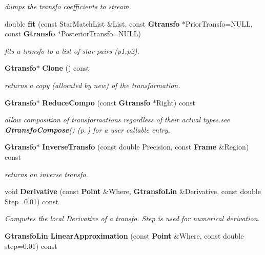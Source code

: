 \begin{CompactItemize}
\begin{CompactList}\small\item\em dumps the transfo coefficients to stream.\item\end{CompactList}\item 
double {\bf fit} (const Star\-Match\-List \&List, const {\bf Gtransfo} $\ast$Prior\-Transfo=NULL, const {\bf Gtransfo} $\ast$Posterior\-Transfo=NULL)
\begin{CompactList}\small\item\em fits a transfo to a list of star pairs (p1,p2).\item\end{CompactList}\item 
{}
{\bf Gtransfo}$\ast$ {\bf Clone} () const\label{class_gtransfoquad_a6}

\begin{CompactList}\small\item\em returns a copy (allocated by new) of the transformation.\item\end{CompactList}\item 
{}
{\bf Gtransfo}$\ast$ {\bf Reduce\-Compo} (const {\bf Gtransfo} $\ast$Right) const\label{class_gtransfoquad_a7}

\begin{CompactList}\small\item\em allow composition of transformations regardless of their actual types.see {\bf Gtransfo\-Compose}() {\rm (p.\,\pageref{gtransfo_h_a1})} for a user callable entry.\item\end{CompactList}\item 
{\bf Gtransfo}$\ast$ {\bf Inverse\-Transfo} (const double Precision, const {\bf Frame} \&Region) const
\begin{CompactList}\small\item\em returns an inverse transfo.\item\end{CompactList}\item 
void {\bf Derivative} (const {\bf Point} \&Where, {\bf Gtransfo\-Lin} \&Derivative, const double Step=0.01) const
\begin{CompactList}\small\item\em Computes the local Derivative of a transfo. Step is used for numerical derivation.\item\end{CompactList}\item 
{}
{\bf Gtransfo\-Lin} {\bf Linear\-Approximation} (const {\bf Point} \&Where, const double step=0.01) const\label{class_gtransfoquad_a10}


\end{CompactItemize}
